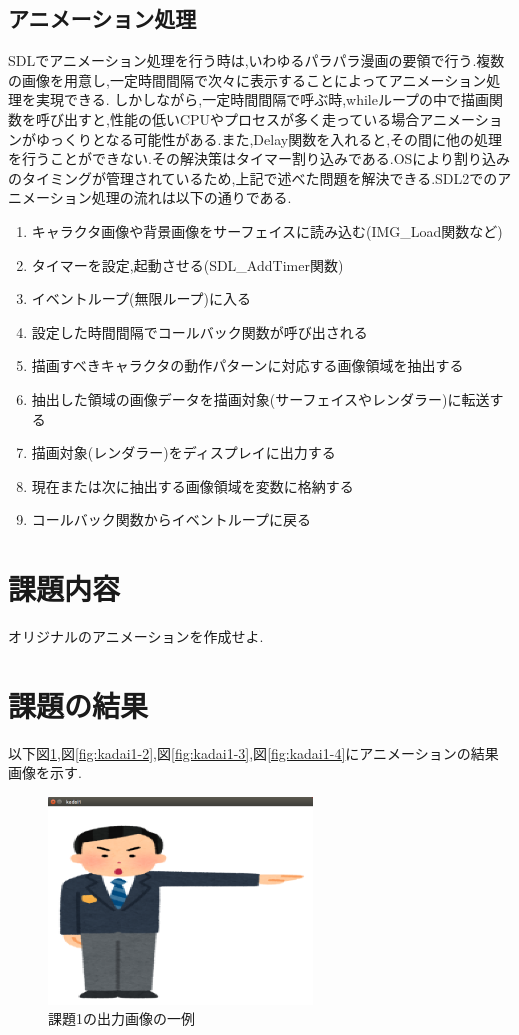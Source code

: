 \documentclass{jarticle}
\begin{document}
	\subsection{アニメーション処理}
	SDLでアニメーション処理を行う時は,いわゆるパラパラ漫画の要領で行う.複数の画像を用意し,一定時間間隔で次々に表示することによってアニメーション処理を実現できる.
	しかしながら,一定時間間隔で呼ぶ時,whileループの中で描画関数を呼び出すと,性能の低いCPUやプロセスが多く走っている場合アニメーションがゆっくりとなる可能性がある.また,Delay関数を入れると,その間に他の処理を行うことができない.その解決策はタイマー割り込みである.OSにより割り込みのタイミングが管理されているため,上記で述べた問題を解決できる.SDL2でのアニメーション処理の流れは以下の通りである.

	\begin{enumerate}
	\item キャラクタ画像や背景画像をサーフェイスに読み込む(IMG\_Load関数など)
	\item タイマーを設定,起動させる(SDL\_AddTimer関数)
	\item イベントループ(無限ループ)に入る
	\item 設定した時間間隔でコールバック関数が呼び出される
	\item 描画すべきキャラクタの動作パターンに対応する画像領域を抽出する
	\item 抽出した領域の画像データを描画対象(サーフェイスやレンダラー)に転送する
	\item 描画対象(レンダラー)をディスプレイに出力する
	\item 現在または次に抽出する画像領域を変数に格納する
	\item コールバック関数からイベントループに戻る
	\end{enumerate}

	\section{課題内容}
	オリジナルのアニメーションを作成せよ.
	\section{課題の結果}
	以下図\ref{fig:kadai1-1},図\ref{fig:kadai1-2},図\ref{fig:kadai1-3},図\ref{fig:kadai1-4}にアニメーションの結果画像を示す.

	\begin{figure}[H]
	\begin{center}
	\includegraphics[width=7.0cm]{images/kadai1-1.png}
	\caption{課題1の出力画像の一例}
	\label{fig:kadai1-1}
	\end{center}
	\end{figure}
\end{document}
